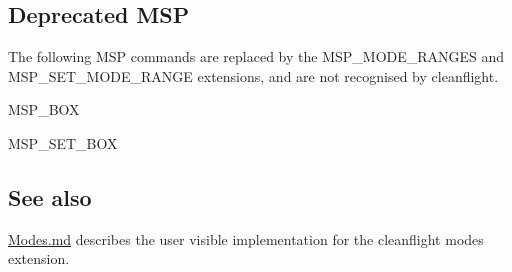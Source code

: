 \subsection*{Deprecated M\+S\+P}

The following M\+S\+P commands are replaced by the M\+S\+P\+\_\+\+M\+O\+D\+E\+\_\+\+R\+A\+N\+G\+E\+S and M\+S\+P\+\_\+\+S\+E\+T\+\_\+\+M\+O\+D\+E\+\_\+\+R\+A\+N\+G\+E extensions, and are not recognised by cleanflight.


\begin{DoxyItemize}
\item M\+S\+P\+\_\+\+B\+O\+X
\item M\+S\+P\+\_\+\+S\+E\+T\+\_\+\+B\+O\+X
\end{DoxyItemize}

\subsection*{See also }

\hyperlink{Modes_8md}{Modes.\+md} describes the user visible implementation for the cleanflight modes extension. 